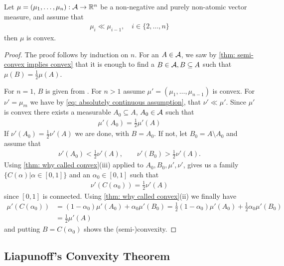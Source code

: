 \begin{lemma}\label{lem: chain of ac}
Let $\mu=(\mu_{1}, \dots, \mu_{n}):\mathcal{A}\to \mathbb{R}^{n}$ be a non-negative and purely non-atomic vector measure, and assume that
\begin{align}
	\mu_{i} \ll \mu_{i-1}, \quad i\in \{2, \dots, n \} \label{eq: absolutely continuous assumption}
\end{align}
then $\mu$ is convex.
\end{lemma}
\begin{proof}
The proof follows by induction on $n$. For an $A\in \mathcal{A}$, we saw by \cref{thm: semi-convex implies convex} that it is enough to find a $B\in \mathcal{A}, B\subseteq A$ such that $\mu(B)=\frac{1}{2}\mu(A)$.

For $n=1$, $B$ is given from . For $n>1$ assume $\mu'=(\mu_{1}, \dots, \mu_{n-1})$ is convex. For $\nu'=\mu_{m}$ we have by \eqref{eq: absolutely continuous assumption}, that $\nu' \ll \mu'$.
Since $\mu'$ is convex there exists a measurable $A_{0}\subseteq A$, $A_{0}\in \mathcal{A}$ such that
\begin{align*}
	\mu'(A_{0})=\frac{1}{2}\mu'(A)
\end{align*}
If $\nu'(A_{0})=\frac{1}{2}\nu'(A)$ we are done, with $B=A_{0}$. If not, let $B_{0}=A\setminus A_{0}$ and assume that
\begin{align*}
	\nu'(A_{0})<\frac{1}{2}\nu'(A), \qquad \nu'(B_{0})>\frac{1}{2}\nu'(A).
\end{align*}
Using \cref{thm: why called convex}(iii) applied to $A_{0}, B_{0}, \mu',\nu'$, gives us a family $\{C(\alpha)|\alpha\in[0,1]\}$ and an $\alpha_{0}\in [0,1]$ such that
\begin{align*}
	\nu'(C(\alpha_{0}))=\frac{1}{2}\nu'(A)
\end{align*}
since $[0,1]$ is connected. Using \cref{thm: why called convex}(ii) we finally have
\begin{align*}
	\mu'(C(\alpha_{0}))&=(1-\alpha_{0})\mu'(A_{0})+\alpha_{0}\mu'(B_{0}) = \frac{1}{2}(1-\alpha_{0})\mu'(A_{0})+\frac{1}{2}\alpha_{0}\mu'(B_{0}) \\
	&=\frac{1}{2}\mu'(A)
\end{align*}
and putting $B=C(\alpha_{0})$ shows the (semi-)convexity.
\end{proof}

\subsection{Liapunoff's Convexity Theorem}

